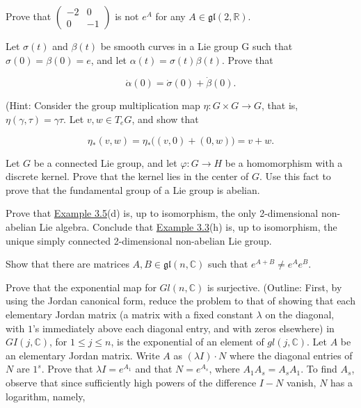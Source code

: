 \begin{problemset}
\item Prove that  $ \begin{pmatrix}-2 & 0 \\ 0 & -1\end{pmatrix} $ is not  $ e^A $ for any  $ A \in \mathfrak{gl}(2, \mathbb{R}) $.

\item Let  $ \sigma(t) $ and  $ \beta(t) $ be smooth curves in a Lie group G such that  $ \sigma(0) = \beta(0) = e $, and let  $ \alpha(t) = \sigma(t)\beta(t) $. Prove that

\[
\dot{\alpha}(0)=\dot{\sigma}(0)+\dot{\beta}(0).
\]

(Hint: Consider the group multiplication map  $ \eta\colon G\times G\to G $, that is,  $ \eta(\gamma,\tau)=\gamma\tau $. Let  $ v,w\in T_{e} G $, and show that

\[
\eta_{*}(v,w)=\eta_{*}\big((v,0)+(0,w)\big)=v+w.
\]

\item Let $G$ be a connected Lie group, and let $\varphi: G \to H$ be a homomorphism with a discrete kernel. Prove that the kernel lies in the center of $G$. Use this fact to prove that the fundamental group of a Lie group is abelian.

\item Prove that \hyperref[thm:3.5]{Example 3.5}(d) is, up to isomorphism, the only 2-dimensional non-abelian Lie algebra. Conclude that \hyperref[thm:3.3]{Example 3.3}(h) is, up to isomorphism, the unique simply connected 2-dimensional non-abelian Lie group.

\item Show that there are matrices  $ A, B \in \mathfrak{gl}(n, \mathbb{C}) $ such that  $ e^{A+B} \neq e^{A} e^{B} $.

\item Prove that the exponential map for $Gl(n,\mathbb{C})$ is surjective. (Outline: First, by using the Jordan canonical form, reduce the problem to that of showing that each elementary Jordan matrix (a matrix with a fixed constant $\lambda$ on the diagonal, with $1$'s immediately above each diagonal entry, and with zeros elsewhere) in $GI(j,\mathbb{C})$, for $1 \leq j \leq n$, is the exponential of an element of $gl(j,\mathbb{C})$. Let $A$ be an elementary Jordan matrix. Write $A$ as $(\lambda I) \cdot N$ where the diagonal entries of $N$ are $1^s$. Prove that $\lambda I = e^{A_1}$ and that $N = e^{A_s}$, where $A_1 A_s = A_s A_1$. To find $A_s$, observe that since sufficiently high powers of the difference $I - N$ vanish, $N$ has a logarithm, namely,


\end{problemset}

